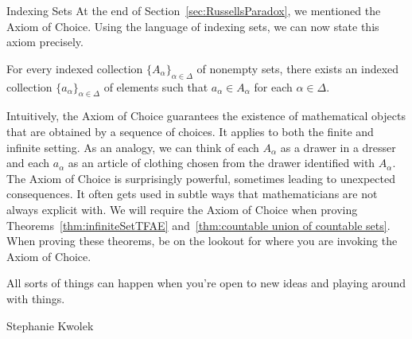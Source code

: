 \begin{section}{Indexing Sets}
At the end of Section~\ref{sec:RussellsParadox}, we mentioned the Axiom of Choice.  Using the language of indexing sets, we can now state this axiom precisely.

\begin{axiom}
For every indexed collection $\{A_{\alpha}\}_{\alpha\in\Delta}$ of nonempty sets, there exists an indexed collection $\{a_{\alpha}\}_{\alpha\in\Delta}$ of elements such that $a_{\alpha}\in A_{\alpha}$ for each $\alpha\in \Delta$.
\end{axiom}

Intuitively, the Axiom of Choice guarantees the existence of mathematical objects that are obtained by a sequence of choices. It applies to both the finite and infinite setting. As an analogy, we can think of each $A_{\alpha}$ as a drawer in a dresser and each $a_{\alpha}$ as an article of clothing chosen from the drawer identified with $A_{\alpha}$. The Axiom of Choice is surprisingly powerful, sometimes leading to unexpected consequences. It often gets used in subtle ways that mathematicians are not always explicit with.  We will require the Axiom of Choice when proving Theorems~\ref{thm:infiniteSetTFAE} and~\ref{thm:countable union of countable sets}. When proving these theorems, be on the lookout for where you are invoking the Axiom of Choice.

\epigraph{All sorts of things can happen when you're open to new ideas and playing around with things.}{Stephanie Kwolek}

\end{section}